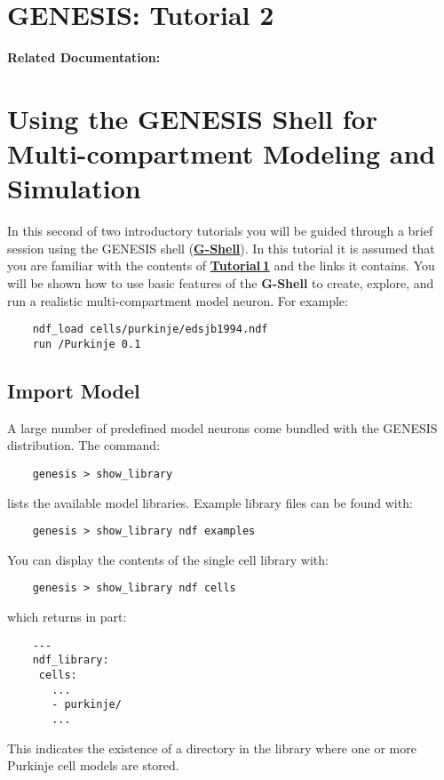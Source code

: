 \documentclass[12pt]{article}
\begin{document}
\section*{GENESIS: Tutorial 2}

{\bf Related Documentation:}

\section*{Using the GENESIS Shell for\\Multi-compartment Modeling and Simulation}

In this second of two introductory tutorials you will be guided through a brief session using the GENESIS shell (\href{../gshell/gshell.tex}{\bf G-Shell}). In this tutorial it is assumed that you are familiar with the contents of \href{../tutorial1/tutorial1.tex}{\bf Tutorial\,1} and the links it contains. You will be shown how to use basic features of the {\bf G-Shell} to create, explore, and run a realistic multi-compartment model neuron. For example:
\begin{verbatim}
    ndf_load cells/purkinje/edsjb1994.ndf
    run /Purkinje 0.1
\end{verbatim}

\subsection*{Import Model}

A large number of predefined model neurons come bundled with the GENESIS distribution. The command:
\begin{verbatim}
    genesis > show_library
\end{verbatim}
lists the available model libraries. Example library files can be found with:
\begin{verbatim}
    genesis > show_library ndf examples
\end{verbatim}
You can display the contents of the single cell library with:
\begin{verbatim}
    genesis > show_library ndf cells
\end{verbatim}
which returns in part:
\begin{verbatim}
    ---
    ndf_library:
     cells:
       ...
       - purkinje/
       ...
\end{verbatim}
This indicates the existence of a directory in the library where one or more Purkinje cell models are stored.
\end{document}
